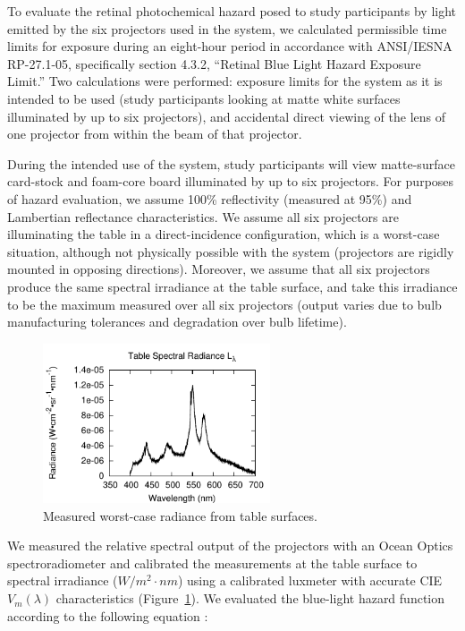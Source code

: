 \documentclass[10pt]{article}
\begin{document}
To evaluate the retinal photochemical hazard posed to study
participants by light emitted by the six projectors used in the
system, we calculated permissible time limits for exposure during an
eight-hour period in accordance with ANSI/IESNA RP-27.1-05,
specifically section 4.3.2, ``Retinal Blue Light Hazard Exposure
Limit.''  Two calculations were performed: exposure limits for the
system as it is intended to be used (study participants looking at
matte white surfaces illuminated by up to six projectors), and
accidental direct viewing of the lens of one projector from within the
beam of that projector.

During the intended use of the system, study participants will view
matte-surface card-stock and foam-core board illuminated by up to six
projectors.  For purposes of hazard evaluation, we assume 100\%
reflectivity (measured at 95\%) and Lambertian reflectance
characteristics.  We assume all six projectors are illuminating the
table in a direct-incidence configuration, which is a worst-case
situation, although not physically possible with the system
(projectors are rigidly mounted in opposing directions).  Moreover, we
assume that all six projectors produce the same spectral irradiance
at the table surface, and take this irradiance to be the maximum
measured over all six projectors (output varies due to bulb
manufacturing tolerances and degradation over bulb lifetime).

\begin{figure}[t]
  \begin{center}
    \includegraphics[width=0.6\textwidth]{images/table_radiance.pdf}
  \end{center}
  \caption{Measured worst-case radiance from table surfaces.
\label{FIGURE_worst_case_radiance}
}
\end{figure}

We measured the relative spectral output of the projectors with an
Ocean Optics spectroradiometer and calibrated the measurements at the
table surface to spectral irradiance ($W/m^2\cdot nm$) using a
calibrated luxmeter with accurate CIE $V_m(\lambda)$ characteristics
(Figure~\ref{FIGURE_worst_case_radiance}).  We evaluated the
blue-light hazard function according to the following equation
\cite{ANSI}:
\end{document}
